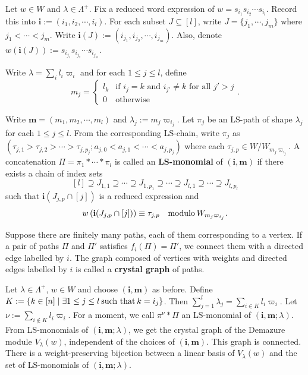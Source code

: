 \documentclass[12pt]{amsart}
\theoremstyle{definition}
\theoremstyle{remark}
\newcommand{\hsp}{\hspace{0.2em}}
\begin{document}
Let $w \in W$ and $\lambda \in \Lambda^+$. Fix a reduced word expression of $w = s_{i_1} s_{i_2} \cdots s_{i_l}$. Record this into $\mathbf{i} := (i_1 , i_2 , \cdots , i_l)$. For each subset $J \subseteq [l]$, write $J = \{ j_1  , \cdots , j_m \}$ where $j_1 < \cdots < j_m$. Write $\mathbf{i}(J) := (i_{j_1} , i_{j_2}, \cdots , i_{j_m})$. Also, denote $w(\mathbf{i}(J)):= s_{i_{j_1}} s_{i_{j_2}} \cdots s_{i_{j_m}}$.

Write $\lambda = \sum_{i} l_i \varpi_i$ and for each $1 \leq j \leq l$, define
\begin{equation}\label{eqn3.18}
m_j = 
\begin{cases}
l_k & \text{if }i_j = k \text{ and }i_{j'} \neq k \text{ for all }j' > j \\
0 & \text{otherwise}
\end{cases}
.
\end{equation}

Write $\mathbf{m} = (m_1 , m_2 , \cdots , m_l)$ and $\lambda_j:= m_j \varpi_{i_j}$. Let $\pi_j$ be an LS-path of shape $\lambda_j$ for each $1 \leq j \leq l$. From the corresponding LS-chain, write $\pi_j$ as $(\tau_{j,1} > \tau_{j,2} > \cdots > \tau_{j,p_j} ; a_{j,0} < a_{j,1} < \cdots < a_{j,p_j})$ where each $\tau_{j,p} \in W/W_{m_j \varpi_{i_j}}$. A concatenation $\Pi = \pi_1 * \cdots * \pi_l$ is called an \textbf{LS-monomial} of $(\mathbf{i} , \mathbf{m})$ if there exists a chain of index sets
\begin{equation}\label{eqn3.19}
[l] \supseteq J_{1,1} \supseteq \cdots \supseteq J_{1, p_1} \supseteq \cdots \supseteq J_{l,1} \supseteq \cdots \supseteq J_{l,p_l}
\end{equation}
such that $\mathbf{i}(J_{j,p} \cap [j])$ is a reduced expression and
\begin{equation}\label{eqn3.20}
w \left(  \mathbf{i}(J_{j,p} \cap [j]) \right) \equiv \tau_{j,p} \quad {\rm modulo} \hspace{0.2em} W_{m_j \varpi_{i_j}}.
\end{equation}

Suppose there are finitely many paths, each of them corresponding to a vertex. If a pair of paths $\Pi$ and $\Pi'$ satisfies $f_i (\Pi) = \Pi'$, we connect them with a directed edge labelled by $i$. The graph composed of vertices with weights and directed edges labelled by $i$ is called a \textbf{crystal graph} of paths.

Let $\lambda \in \Lambda^+$, $w \in W$ and choose $(\mathbf{i} , \mathbf{m})$ as before. Define $K := \{ k \in [n] \mid \exists 1 \leq j \leq l \hsp \text{such that} \hsp k = i_j \} $. Then $\sum_{j=1}^l \lambda_j= \sum_{i \in K} l_i \varpi_i$. Let $\nu := \sum_{i \notin K} l_i \varpi_i$. For a moment, we call $\pi^\nu * \Pi$ an LS-monomial of $(\mathbf{i} , \mathbf{m} ; \lambda)$. From LS-monomials of $(\mathbf{i} , \mathbf{m} ; \lambda)$, we get the crystal graph of the Demazure module $V_\lambda (w)$, independent of the choices of $(\mathbf{i} , \mathbf{m})$. This graph is connected. There is a weight-preserving bijection between a linear basis of $V_\lambda (w)$ and the set of LS-monomials of $(\mathbf{i} , \mathbf{m} ;\lambda)$.
\end{document}

